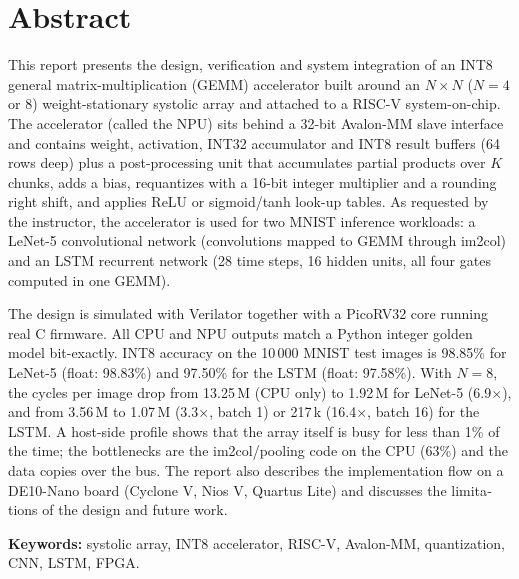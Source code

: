 \chapter*{Abstract}
\begin{otherlanguage}{english}
This report presents the design, verification and system integration of an INT8 general matrix-multiplication (GEMM) accelerator built around an $N\times N$ ($N=4$ or $8$) weight-stationary systolic array and attached to a RISC-V system-on-chip. The accelerator (called the NPU) sits behind a 32-bit Avalon-MM slave interface and contains weight, activation, INT32 accumulator and INT8 result buffers (64 rows deep) plus a post-processing unit that accumulates partial products over $K$ chunks, adds a bias, requantizes with a 16-bit integer multiplier and a rounding right shift, and applies ReLU or sigmoid/tanh look-up tables. As requested by the instructor, the accelerator is used for two MNIST inference workloads: a LeNet-5 convolutional network (convolutions mapped to GEMM through im2col) and an LSTM recurrent network (28 time steps, 16 hidden units, all four gates computed in one GEMM).

The design is simulated with Verilator together with a PicoRV32 core running real C firmware. All CPU and NPU outputs match a Python integer golden model bit-exactly. INT8 accuracy on the 10\,000 MNIST test images is 98.85\% for LeNet-5 (float: 98.83\%) and 97.50\% for the LSTM (float: 97.58\%). With $N=8$, the cycles per image drop from 13.25\,M (CPU only) to 1.92\,M for LeNet-5 (6.9$\times$), and from 3.56\,M to 1.07\,M (3.3$\times$, batch 1) or 217\,k (16.4$\times$, batch 16) for the LSTM. A host-side profile shows that the array itself is busy for less than 1\% of the time; the bottlenecks are the im2col/pooling code on the CPU (63\%) and the data copies over the bus. The report also describes the implementation flow on a DE10-Nano board (Cyclone V, Nios V, Quartus Lite) and discusses the limitations of the design and future work.

\vspace{0.3cm}
\noindent\textbf{Keywords:} systolic array, INT8 accelerator, RISC-V, Avalon-MM, quantization, CNN, LSTM, FPGA.
\end{otherlanguage}
